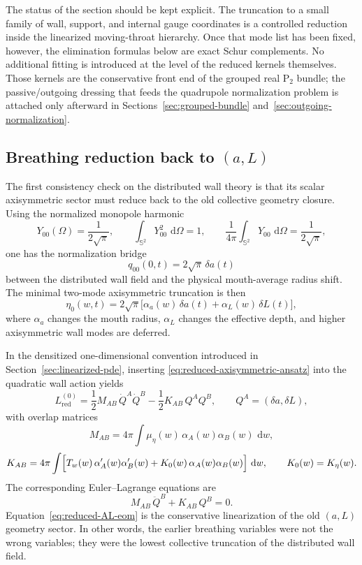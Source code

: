 \documentclass[11pt]{article}
\theoremstyle{definition}
\newcommand{\dd}{\,\mathrm{d}}
\newcommand{\Ptwo}{\ensuremath{\mathrm{P}_2}}
\newcommand{\bbS}{\mathbb S}
\begin{document}
The status of the section should be kept explicit. The truncation to a small family of wall, support, and internal gauge coordinates is a controlled reduction inside the linearized moving-throat hierarchy. Once that mode list has been fixed, however, the elimination formulas below are exact Schur complements. No additional fitting is introduced at the level of the reduced kernels themselves. Those kernels are the conservative front end of the grouped real $\Ptwo$ bundle; the passive/outgoing dressing that feeds the quadrupole normalization problem is attached only afterward in Sections~\ref{sec:grouped-bundle} and~\ref{sec:outgoing-normalization}.

\subsection{Breathing reduction back to \texorpdfstring{$(a,L)$}{(a,L)}}

The first consistency check on the distributed wall theory is that its scalar axisymmetric sector must reduce back to the old collective geometry closure. Using the normalized monopole harmonic
\[
Y_{00}(\Omega)=\frac{1}{2\sqrt{\pi}},
\qquad
\int_{\bbS^2}Y_{00}^2\,\dd\Omega=1,
\qquad
\frac{1}{4\pi}\int_{\bbS^2}Y_{00}\,\dd\Omega=\frac{1}{2\sqrt{\pi}},
\]
one has the normalization bridge
\[
q_{00}(0,t)=2\sqrt{\pi}\,\delta a(t)
\]
between the distributed wall field and the physical mouth-average radius shift. The minimal two-mode axisymmetric truncation is then
\begin{equation}
\eta_0(w,t)=2\sqrt{\pi}\bigl[\alpha_a(w)\,\delta a(t)+\alpha_L(w)\,\delta L(t)\bigr],
\label{eq:reduced-axisymmetric-ansatz}
\end{equation}
where $\alpha_a$ changes the mouth radius, $\alpha_L$ changes the effective depth, and higher axisymmetric wall modes are deferred.

In the densitized one-dimensional convention introduced in Section~\ref{sec:linearized-pde}, inserting \eqref{eq:reduced-axisymmetric-ansatz} into the quadratic wall action yields
\begin{equation}
L_{\mathrm{red}}^{(0)}
=
\frac12 M_{AB}\,\dot Q^A\dot Q^B
-
\frac12 K_{AB}\,Q^A Q^B,
\qquad
Q^A=(\delta a,\delta L),
\label{eq:reduced-AL-lagrangian}
\end{equation}
with overlap matrices
\begin{equation}
M_{AB}=4\pi\int \mu_\eta(w)\,\alpha_A(w)\alpha_B(w)\,\dd w,
\label{eq:reduced-AL-mass}
\end{equation}
\begin{equation}
K_{AB}=4\pi\int
\Bigl[
T_w(w)\,\alpha_A'(w)\alpha_B'(w)
+
K_0(w)\,\alpha_A(w)\alpha_B(w)
\Bigr]\,\dd w,
\qquad
K_0(w)=K_\eta(w).
\label{eq:reduced-AL-stiffness}
\end{equation}
The corresponding Euler--Lagrange equations are
\begin{equation}
M_{AB}\,\ddot Q^B+K_{AB}\,Q^B=0.
\label{eq:reduced-AL-eom}
\end{equation}
Equation~\eqref{eq:reduced-AL-eom} is the conservative linearization of the old $(a,L)$ geometry sector. In other words, the earlier breathing variables were not the wrong variables; they were the lowest collective truncation of the distributed wall field.
\end{document}
